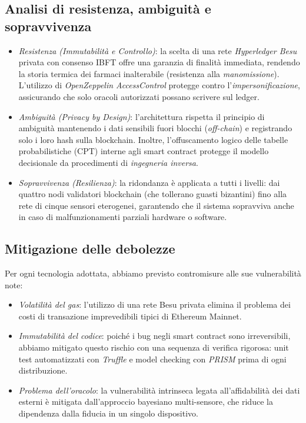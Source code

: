 \subsection{Analisi di resistenza, ambiguità e sopravvivenza}
\begin{itemize}
    \item \textit{Resistenza (Immutabilità e Controllo)}: la scelta di una rete \textit{Hyperledger Besu} privata con consenso IBFT offre una garanzia di finalità immediata, rendendo la storia termica dei farmaci inalterabile (resistenza alla \textit{manomissione}). L'utilizzo di \textit{OpenZeppelin AccessControl} protegge contro l'\textit{impersonificazione}, assicurando che solo oracoli autorizzati possano scrivere sul ledger.
    \item \textit{Ambiguità (Privacy by Design)}: l'architettura rispetta il principio di ambiguità mantenendo i dati sensibili fuori blocchi (\textit{off-chain}) e registrando solo i loro hash sulla blockchain. Inoltre, l'offuscamento logico delle tabelle probabilistiche (CPT) interne agli smart contract protegge il modello decisionale da procedimenti di \textit{ingegneria inversa}.
    \item \textit{Sopravvivenza (Resilienza)}: la ridondanza è applicata a tutti i livelli: dai quattro nodi validatori blockchain (che tollerano guasti bizantini) fino alla rete di cinque sensori eterogenei, garantendo che il sistema sopravviva anche in caso di malfunzionamenti parziali hardware o software.
\end{itemize}

\subsection{Mitigazione delle debolezze}
Per ogni tecnologia adottata, abbiamo previsto contromisure alle sue vulnerabilità note:
\begin{itemize}
    \item \textit{Volatilità del gas}: l'utilizzo di una rete Besu privata elimina il problema dei costi di transazione imprevedibili tipici di Ethereum Mainnet.
    \item \textit{Immutabilità del codice}: poiché i bug negli smart contract sono irreversibili, abbiamo mitigato questo rischio con una sequenza di verifica rigorosa: unit test automatizzati con \textit{Truffle} e model checking con \textit{PRISM} prima di ogni distribuzione.
    \item \textit{Problema dell'oracolo}: la vulnerabilità intrinseca legata all'affidabilità dei dati esterni è mitigata dall'approccio bayesiano multi-sensore, che riduce la dipendenza dalla fiducia in un singolo dispositivo.
\end{itemize}
